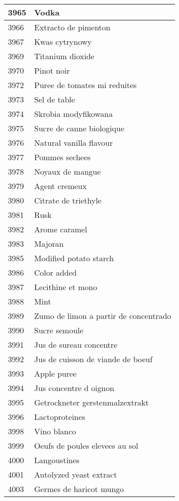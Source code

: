 \begin{longtable}{|l|l|}
3965 & Vodka \\ \hline 
3966 & Extracto de pimenton \\ \hline 
3967 & Kwas cytrynowy \\ \hline 
3969 & Titanium dioxide \\ \hline 
3970 & Pinot noir \\ \hline 
3972 & Puree de tomates mi reduites \\ \hline 
3973 & Sel de table \\ \hline 
3974 & Skrobia modyfikowana \\ \hline 
3975 & Sucre de canne biologique \\ \hline 
3976 & Natural vanilla flavour \\ \hline 
3977 & Pommes sechees \\ \hline 
3978 & Noyaux de mangue \\ \hline 
3979 & Agent cremeux \\ \hline 
3980 & Citrate de triethyle \\ \hline 
3981 & Rusk \\ \hline 
3982 & Arome caramel \\ \hline 
3983 & Majoran \\ \hline 
3985 & Modified potato starch \\ \hline 
3986 & Color added \\ \hline 
3987 & Lecithine et mono \\ \hline 
3988 & Mint \\ \hline 
3989 & Zumo de limon a partir de concentrado \\ \hline 
3990 & Sucre semoule \\ \hline 
3991 & Jus de sureau concentre \\ \hline 
3992 & Jus de cuisson de viande de boeuf \\ \hline 
3993 & Apple puree \\ \hline 
3994 & Jus concentre d oignon \\ \hline 
3995 & Getrockneter gerstenmalzextrakt \\ \hline 
3996 & Lactoproteines \\ \hline 
3998 & Vino blanco \\ \hline 
3999 & Oeufs de poules elevees au sol \\ \hline 
4000 & Langoustines \\ \hline 
4001 & Autolyzed yeast extract \\ \hline 
4003 & Germes de haricot mungo \\ \hline 

\end{longtable}
